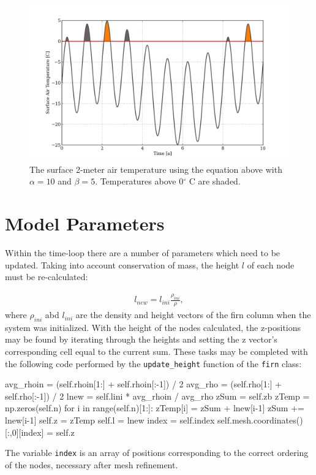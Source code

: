\begin{figure}
  \centering
    \includegraphics[width=\linewidth]{images/firn/surfaceTemp.png}
	\caption{The surface 2-meter air temperature using the equation above with $\alpha = 10$ and $\beta = 5$.  Temperatures above 0$^{\circ}$ C are shaded.}
\end{figure}



\section{Model Parameters}

Within the time-loop there are a number of parameters which need to be updated.  Taking into account conservation of mass, the height $l$ of each node must be re-calculated:\par
\begin{align*}
  l_{new} = l_{ini} \frac{\rho_{ini}}{\rho},
\end{align*}
where $\rho_{ini}$ abd $l_{ini}$ are the density and height vectors of the firn column when the system was initialized.  With the height of the nodes calculated, the z-positions may be found by iterating through the heights and setting the z vector's corresponding cell equal to the current sum.  These tasks may be completed with the following code performed by the \texttt{update\_height} function of the \texttt{firn} class:\par
\begin{python}
avg_rhoin = (self.rhoin[1:] + self.rhoin[:-1])
            / 2
avg_rho   = (self.rho[1:] + self.rho[:-1]) / 2
lnew      = self.lini * avg_rhoin / avg_rho
zSum      = self.zb
zTemp     = np.zeros(self.n)
for i in range(self.n)[1:]:
  zTemp[i] = zSum + lnew[i-1]
  zSum    += lnew[i-1]
self.z    = zTemp
self.l    = lnew
index     = self.index
self.mesh.coordinates()[:,0][index] = self.z
\end{python}
The variable \texttt{index} is an array of positions corresponding to the correct ordering of the nodes, necessary after mesh refinement.  

